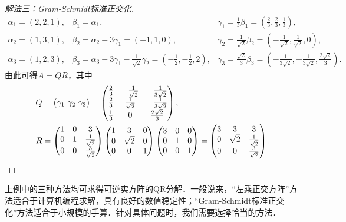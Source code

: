 \documentclass[a4paper,fontset=windows]{ctexbook}
\theoremstyle{definition}
\def\note{\noindent\raisebox{10pt}{\dbend}\hspace{7pt}}
\begin{document}
\begin{proof}[解法三：Gram-Schmidt标准正交化]
$$\begin{array}{lll}
\alpha_1=(2,2,1), &\beta_1=\alpha_1, &\gamma_1=\frac{1}{3}\beta_1=(\frac{2}{3},\frac{2}{3},\frac{1}{3}), \\
\alpha_2=(1,3,1), &\beta_2=\alpha_2-3\gamma_1=(-1,1,0), &\gamma_2=\frac{1}{\sqrt{2}}\beta_2=(-\frac{1}{\sqrt{2}},\frac{1}{\sqrt{2}},0), \\
\alpha_3=(1,2,3), &\beta_3=\alpha_3-3\gamma_1-\frac{1}{\sqrt{2}}\gamma_2=(-\frac{1}{2},-\frac{1}{2},2), &\gamma_3=\frac{\sqrt{2}}{3}\beta_3=(-\frac{1}{3\sqrt{2}},-\frac{1}{3\sqrt{2}},\frac{2\sqrt{2}}{3}).
\end{array}$$
由此可得$A=QR$，其中
\begin{align*}
Q&=\begin{pmatrix}\gamma_1~\gamma_2~\gamma_3\end{pmatrix}=\begin{pmatrix}\frac{2}{3}&-\frac{1}{\sqrt{2}}&-\frac{1}{3\sqrt{2}} \\ \frac{2}{3}&\frac{1}{\sqrt{2}}&-\frac{1}{3\sqrt{2}} \\ \frac{1}{3}&0&\frac{2\sqrt{2}}{3}\end{pmatrix}, \\
R&=\begin{pmatrix}1&0&3 \\ 0&1&\frac{1}{\sqrt{2}} \\ 0&0&\frac{3}{\sqrt{2}}\end{pmatrix}\begin{pmatrix}1&3&0 \\ 0&\sqrt{2}&0 \\ 0&0&1\end{pmatrix}\begin{pmatrix}3&0&0 \\ 0&1&0 \\ 0&0&1\end{pmatrix}=\begin{pmatrix}3&3&3 \\ 0&\sqrt{2}&\frac{1}{\sqrt{2}} \\ 0&0&\frac{3}{\sqrt{2}}\end{pmatrix}. \qedhere
\end{align*}
\end{proof}

\note 上例中的三种方法均可求得可逆实方阵的QR分解．一般说来，“左乘正交方阵”方法适合于计算机编程求解，具有良好的数值稳定性；“Gram-Schmidt标准正交化”方法适合于小规模的手算．针对具体问题时，我们需要选择恰当的方法．
\end{document}
